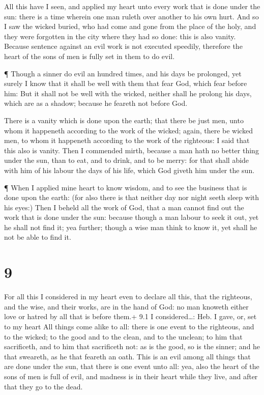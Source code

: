  All this have I seen, and applied my heart unto every work
that is done under the sun: there is a time wherein one man ruleth over
another to his own hurt.  And so I saw the wicked buried,
who had come and gone from the place of the holy, and they were
forgotten in the city where they had so done: this is also vanity.
 Because sentence against an evil work is not executed
speedily, therefore the heart of the sons of men is fully set in them to
do evil.

 ¶ Though a sinner do evil an hundred times, and his days
be prolonged, yet surely I know that it shall be well with them that
fear God, which fear before him:  But it shall not be well
with the wicked, neither shall he prolong his days, which are as a
shadow; because he feareth not before God.

 There is a vanity which is done upon the earth; that there
be just men, unto whom it happeneth according to the work of the wicked;
again, there be wicked men, to whom it happeneth according to the work
of the righteous: I said that this also is vanity.  Then I
commended mirth, because a man hath no better thing under the sun, than
to eat, and to drink, and to be merry: for that shall abide with him of
his labour the days of his life, which God giveth him under the sun.

 ¶ When I applied mine heart to know wisdom, and to see the
business that is done upon the earth: (for also there is that neither
day nor night seeth sleep with his eyes:)  Then I beheld
all the work of God, that a man cannot find out the work that is done
under the sun: because though a man labour to seek it out, yet he shall
not find it; yea further; though a wise man think to know it, yet shall
he not be able to find it.

\hypertarget{section-8}{%
\section{9}\label{section-8}}

 For all this I considered in my heart even to declare all
this, that the righteous, and the wise, and their works, are in the hand
of God: no man knoweth either love or hatred by all that is before
them.+ 9.1 I considered\ldots: Heb. I gave, or, set to my heart
 All things come alike to all: there is one event to the
righteous, and to the wicked; to the good and to the clean, and to the
unclean; to him that sacrificeth, and to him that sacrificeth not: as is
the good, so is the sinner; and he that sweareth, as he that feareth an
oath.  This is an evil among all things that are done under
the sun, that there is one event unto all: yea, also the heart of the
sons of men is full of evil, and madness is in their heart while they
live, and after that they go to the dead.

